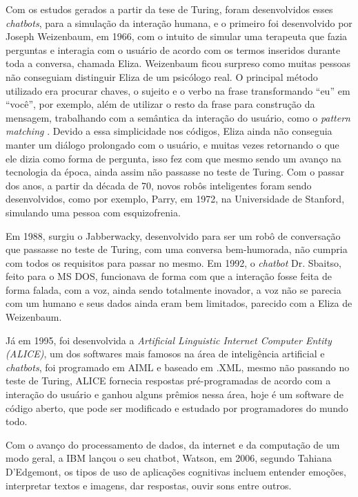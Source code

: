 \documentclass[
	12pt,				%
	oneside,
	a4paper,			%
	english,			%
	french,				%
	spanish,			%
	brazil				%
	]{abntex2}
\begin{document}
Com os estudos gerados a partir da tese de Turing, foram desenvolvidos esses \emph{chatbots}, para a simulação da interação humana, e o primeiro foi desenvolvido por Joseph Weizenbaum, em 1966, com o intuito de simular uma terapeuta que fazia perguntas e interagia com o usuário de acordo com os termos inseridos durante toda a conversa, chamada Eliza.
Weizenbaum ficou surpreso como muitas pessoas não conseguiam distinguir Eliza de um psicólogo real. 
O principal método utilizado era procurar chaves, o sujeito e o verbo na frase transformando “eu” em “você”, por exemplo, além de utilizar o resto da frase para construção da mensagem, trabalhando com a semântica da interação do usuário, como o \emph{pattern matching} \cite{weizenbaum-eliza}. Devido a essa simplicidade nos códigos, Eliza ainda não conseguia manter um diálogo prolongado com o usuário, e muitas vezes retornando o que ele dizia como forma de pergunta, isso fez com que mesmo sendo um avanço na tecnologia da época, ainda assim não passasse no teste de Turing.
Com o passar dos anos, a partir da década de 70, novos robôs inteligentes foram sendo desenvolvidos, como por exemplo, Parry, em 1972, na Universidade de Stanford, simulando uma pessoa com esquizofrenia. 

Em 1988, surgiu o Jabberwacky, desenvolvido para ser um robô de conversação que passasse no teste de Turing, com uma conversa bem-humorada, não cumpria com todos os requisitos para passar no mesmo. 
Em 1992, o \emph{chatbot} Dr. Sbaitso, feito para o MS DOS, funcionava de forma com que a interação fosse feita de forma falada, com a voz, ainda sendo totalmente inovador, a voz não se parecia com um humano e seus dados ainda eram bem limitados, parecido com a Eliza de Weizenbaum.

Já em 1995, foi desenvolvida a \emph{Artificial Linguistic Internet Computer Entity (ALICE)}, um dos softwares mais famosos na área de inteligência artificial e \emph{chatbots}, foi programado em AIML e baseado em .XML, mesmo não passando no teste de Turing, ALICE fornecia respostas pré-programadas de acordo com a interação do usuário e ganhou alguns prêmios nessa área, hoje é um software de código aberto, que pode ser modificado e estudado por programadores do mundo todo.

Com o avanço do processamento de dados, da internet e da computação de um modo geral, a IBM lançou o seu chatbot, Watson, em 2006, segundo Tahiana D'Edgemont, os tipos de uso de aplicações cognitivas incluem entender emoções, interpretar textos e imagens, dar respostas, ouvir sons entre outros.
\end{document}
